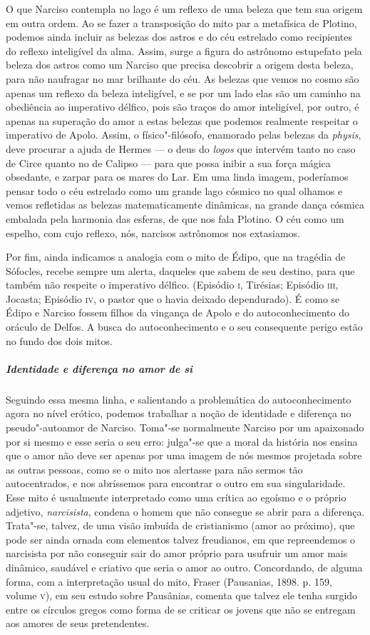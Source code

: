 O que Narciso contempla no lago é um reflexo de uma beleza que tem sua
origem em outra ordem. Ao se fazer a transposição do mito par a
metafísica de Plotino, podemos ainda incluir as belezas dos astros e
do céu estrelado como recipientes do reflexo inteligível da alma.
Assim, surge a figura do astrônomo estupefato pela beleza dos astros
como um Narciso que precisa descobrir a origem desta beleza, para não
naufragar no mar brilhante do céu. As belezas que vemos no cosmo são
apenas um reflexo da beleza inteligível, e se por um lado elas são um
caminho na obediência ao imperativo délfico, pois são traços do amor
inteligível, por outro, é apenas na superação do amor a estas belezas
que podemos realmente respeitar o imperativo de Apolo. Assim, o
físico"-filósofo, enamorado pelas belezas da \emph{physis}, deve
procurar a ajuda de Hermes --- o deus do \emph{logos} que intervém
tanto no caso de Circe quanto no de Calipso --- para que possa inibir a
sua força mágica obsedante, e zarpar para os mares do Lar. Em uma
linda imagem, poderíamos pensar todo o céu estrelado como um grande
lago cósmico no qual olhamos e vemos refletidas as belezas
matematicamente dinâmicas, na grande dança cósmica embalada pela
harmonia das esferas, de que nos fala Plotino. O céu como um espelho,
com cujo reflexo, nós, narcisos astrônomos nos extasiamos.  

Por fim, ainda indicamos a analogia com o mito de Édipo, que na
tragédia de Sófocles, recebe sempre um alerta, daqueles que sabem de
seu destino, para que também não respeite o imperativo délfico.
(Episódio \textsc{i}, Tirésias; Episódio \textsc{iii}, Jocasta; Episódio
\textsc{iv}, o pastor
que o havia deixado dependurado). É como se Édipo e Narciso fossem
filhos da vingança de Apolo e do autoconhecimento do oráculo de
Delfos. A busca do autoconhecimento e o seu consequente perigo estão
no fundo dos dois mitos.

\subparagraph{Identidade e diferença no amor de si}

Seguindo essa mesma linha, e salientando a problemática do
autoconhecimento agora no nível erótico, podemos trabalhar a noção
de identidade e diferença no pseudo"-autoamor de Narciso. Toma"-se
normalmente Narciso por um apaixonado por si mesmo e esse seria o seu
erro: julga"-se que a moral da história nos ensina que o amor não deve
ser apenas por uma imagem de nós mesmos projetada sobre as outras
pessoas, como se o mito nos alertasse para não sermos tão
autocentrados, e nos abríssemos para encontrar o outro em sua
singularidade. Esse mito é usualmente interpretado como uma crítica
ao egoísmo e o próprio adjetivo, \emph{narcisista}, condena o homem
que não consegue se abrir para a diferença. Trata"-se, talvez, de uma
visão imbuída de cristianismo (amor ao próximo), que pode ser ainda
ornada com elementos talvez freudianos, em que repreendemos o
narcisista por não conseguir sair do amor próprio para usufruir um
amor mais dinâmico, saudável e criativo que seria o amor ao outro.
Concordando, de alguma forma, com a interpretação usual do mito,
Fraser (Pausanias, 1898. p. 159, volume \textsc{v}), em seu estudo sobre
Pausânias, comenta que talvez ele tenha surgido entre os círculos
gregos como forma de se criticar os jovens que não se entregam aos
amores de seus pretendentes.

